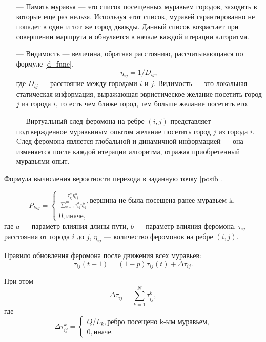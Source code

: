 \begin{itemize}[itemindent=1.25em]
	\item[---] Память муравья --- это список посещенных муравьем городов, заходить в которые еще раз нельзя.
	Используя этот список, муравей гарантированно не попадет в один и тот же город дважды. 
	Данный список возрастает при совершении маршрута и обнуляется в начале каждой итерации алгоритма.
	
	\item[---] Видимость --- величина, обратная расстоянию, рассчитывающаяся по формуле \ref{d_func}.
	\begin{equation}
		\label{d_func}
		\eta_{ij} = 1 / D_{ij},
	\end{equation} 
	где $D_{ij}$ --- расстояние между городами $i$ и $j$. 
	Видимость --- это локальная статическая информация, выражающая эвристическое желание посетить город $j$ из города $i$, то есть чем ближе город, тем больше желание посетить его.
	
	\item[---] Виртуальный след феромона на ребре $(i, j)$ представляет подтвержденное муравьиным опытом желание посетить город $j$ из города $i$. Cлед феромона является глобальной и динамичной информацией --- она изменяется после каждой итерации алгоритма, отражая приобретенный муравьями опыт.
\end{itemize}

Формула вычисления вероятности перехода в заданную точку \eqref{posib}.

\begin{equation}
	\label{posib}
	P_{kij} = \begin{cases}
		\frac{\tau_{ij}^a\eta_{ij}^b}{\sum_{q=1}^m \tau^a_{iq}\eta^b_{iq}}, \textrm{вершина не была посещена ранее муравьем k,} \\
		0, \textrm{иначе,}
	\end{cases}
\end{equation}
где $a$ --- параметр влияния длины пути, $b$ --- параметр влияния феромона, $\tau_{ij}$~--- расстояния от города $i$ до $j$, $\eta_{ij}$ --- количество феромонов на ребре $(i, j)$.

Правило обновления феромона после движения всех муравьев:
\begin{equation}
	\label{update_phero_1}
	\tau_{ij}(t+1) = (1-p)\tau_{ij}(t) + \Delta \tau_{ij}.
\end{equation}

При этом
\begin{equation}
	\label{update_phero_2}
	\Delta \tau_{ij} = \sum_{k=1}^N \tau^k_{ij},
\end{equation}
где
\begin{equation}
	\label{update_phero_3}
	\Delta\tau^k_{ij} = \begin{cases}
		Q/L_{k}, \textrm{ребро посещено k-ым муравьем,} \\
		0, \textrm{иначе.}
	\end{cases}
\end{equation}

